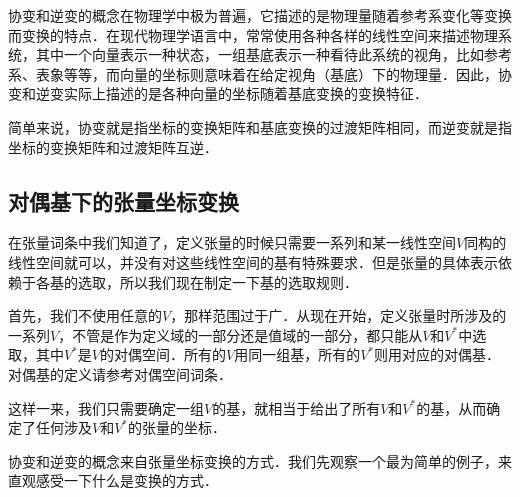 
\begin{issues}
\issueTODO
\end{issues}


协变和逆变的概念在物理学中极为普遍，它描述的是物理量随着参考系变化等变换而变换的特点．在现代物理学语言中，常常使用各种各样的线性空间来描述物理系统，其中一个向量表示一种状态，一组基底表示一种看待此系统的视角，比如参考系、表象等等，而向量的坐标则意味着在给定视角（基底）下的物理量．因此，协变和逆变实际上描述的是各种向量的坐标随着基底变换的变换特征．

简单来说，协变就是指坐标的变换矩阵和基底变换的过渡矩阵相同，而逆变就是指坐标的变换矩阵和过渡矩阵互逆．

\subsection{对偶基下的张量坐标变换}

在张量词条中我们知道了，定义张量的时候只需要一系列和某一线性空间$V$同构的线性空间就可以，并没有对这些线性空间的基有特殊要求．但是张量的具体表示依赖于各基的选取，所以我们现在制定一下基的选取规则．

首先，我们不使用任意的$V$，那样范围过于广．从现在开始，定义张量时所涉及的一系列$V$，不管是作为定义域的一部分还是值域的一部分，都只能从$V$和$V^*$中选取，其中$V^*$是$V$的对偶空间．所有的$V$用同一组基，所有的$V^*$则用对应的对偶基．对偶基的定义请参考对偶空间词条．

这样一来，我们只需要确定一组$V$的基，就相当于给出了所有$V$和$V^*$的基，从而确定了任何涉及$V$和$V^*$的张量的坐标．



协变和逆变的概念来自张量坐标变换的方式．我们先观察一个最为简单的例子，来直观感受一下什么是变换的方式．

